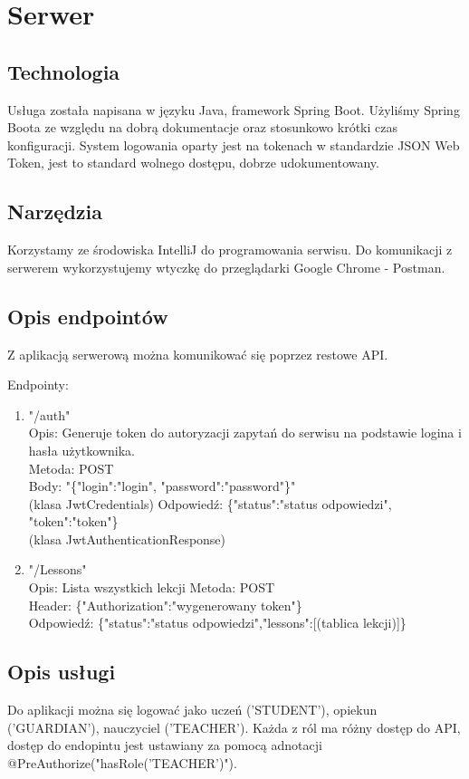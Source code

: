 \documentclass[12pt, titlepage]{article}
\begin{document}
\section{Serwer}

\subsection{Technologia}
Usługa została napisana w języku Java, framework Spring Boot. Użyliśmy Spring Boota ze względu na dobrą dokumentacje oraz stosunkowo krótki czas konfiguracji. System logowania oparty jest na tokenach w standardzie JSON Web Token, jest to standard wolnego dostępu, dobrze udokumentowany.

\subsection{Narzędzia}

Korzystamy ze środowiska IntelliJ do programowania serwisu. Do komunikacji z serwerem wykorzystujemy wtyczkę do przeglądarki Google Chrome - Postman.

\subsection{Opis endpointów}

Z aplikacją serwerową można komunikować się poprzez restowe API.

Endpointy:

\begin{enumerate}

	\item "/auth" \\
	Opis: Generuje token do autoryzacji zapytań do serwisu na podstawie logina i hasła użytkownika.\\
		Metoda: POST\\
		Body: "\{"login":"login", "password":"password"\}"\\ (klasa JwtCredentials)
		Odpowiedź: \{"status":"status odpowiedzi", "token":"token"\}\\
		(klasa JwtAuthenticationResponse)
	
	\item "/Lessons" \\
	Opis: Lista wszystkich lekcji
	Metoda: POST \\
	Header: \{"Authorization":"wygenerowany token"\} \\
	Odpowiedź: \{"status":"status odpowiedzi","lessons":[(tablica lekcji)]\}
	

\end{enumerate}

\subsection{Opis usługi}

Do aplikacji można się logować jako uczeń ('STUDENT'), opiekun ('GUARDIAN'), nauczyciel ('TEACHER'). Każda z ról ma różny dostęp do API, dostęp do endopintu jest ustawiany za pomocą adnotacji @PreAuthorize("hasRole('TEACHER')").
\end{document}
